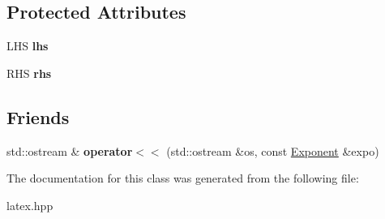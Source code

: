 \subsection*{Protected Attributes}
\begin{DoxyCompactItemize}
\item 
\hypertarget{classlatex_1_1math_1_1Exponent_ad40337048de2ea8e851c22eb049d934e}{L\-H\-S {\bfseries lhs}}\label{classlatex_1_1math_1_1Exponent_ad40337048de2ea8e851c22eb049d934e}

\item 
\hypertarget{classlatex_1_1math_1_1Exponent_a444be024ab8d61010355c8621dc3594a}{R\-H\-S {\bfseries rhs}}\label{classlatex_1_1math_1_1Exponent_a444be024ab8d61010355c8621dc3594a}

\end{DoxyCompactItemize}
\subsection*{Friends}
\begin{DoxyCompactItemize}
\item 
\hypertarget{classlatex_1_1math_1_1Exponent_a56873f9cc4a3a04da6c90eb781512537}{std\-::ostream \& {\bfseries operator$<$$<$} (std\-::ostream \&os, const \hyperlink{classlatex_1_1math_1_1Exponent}{Exponent} \&expo)}\label{classlatex_1_1math_1_1Exponent_a56873f9cc4a3a04da6c90eb781512537}

\end{DoxyCompactItemize}


The documentation for this class was generated from the following file\-:\begin{DoxyCompactItemize}
\item 
latex.\-hpp\end{DoxyCompactItemize}
